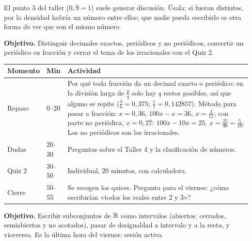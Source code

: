 \documentclass[11pt]{article}
\begin{document}
\begin{nota}
El punto 3 del taller ($0{,}\overline{9} = 1$) suele generar discusión. Úsala: si fueran
distintos, por la densidad habría un número entre ellos; que nadie pueda escribirlo es otra
forma de ver que son el mismo número.
\end{nota}


\textbf{Objetivo.} Distinguir decimales exactos, periódicos y no periódicos, convertir un
periódico en fracción y cerrar el tema de los irracionales con el Quiz 2.

\begin{center}
{\renewcommand{\arraystretch}{1.3}
\begin{tabularx}{\linewidth}{@{}l l X@{}}
  \toprule
  \textbf{Momento} & \textbf{Min} & \textbf{Actividad}\\
  \midrule
  Repaso & 0–20 & Por qué toda fracción da un decimal exacto o periódico: en la división
    larga de $\frac{p}{q}$ solo hay $q$ restos posibles, así que alguno se repite
    ($\frac{3}{8} = 0{,}375$; $\frac{1}{7} = 0{,}\overline{142857}$). Método para pasar a
    fracción: $x = 0{,}\overline{36}$, $100x - x = 36$, $x = \frac{4}{11}$; con parte no
    periódica, $x = 0{,}2\overline{7}$: $100x - 10x = 25$, $x = \frac{25}{90} = \frac{5}{18}$.
    Los no periódicos son los irracionales.\\
  Dudas & 20–30 & Preguntas sobre el Taller 4 y la clasificación de números.\\
  Quiz 2 & 30–50 & Individual, 20 minutos, con calculadora.\\
  Cierre & 50–55 & Se recogen los quices. Pregunta para el viernes: ¿cómo escribirían «todos
    los reales entre 2 y 3»?\\
  \bottomrule
\end{tabularx}}
\end{center}


\textbf{Objetivo.} Escribir subconjuntos de $\mathbb{R}$ como intervalos (abiertos, cerrados,
semiabiertos y no acotados), pasar de desigualdad a intervalo y a la recta, y viceversa. Es la
última hora del viernes: sesión activa.
\end{document}
